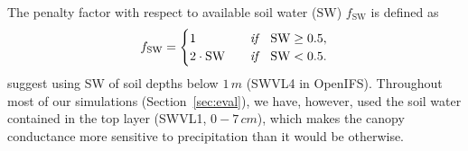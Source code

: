 \documentclass[gmd, manuscript]{copernicus}
\begin{document}
The penalty factor with respect to available soil water ($\text{SW}$) $f_\text{SW}$ is defined as 
%
\begin{equation}
  f_\text{SW} =
  \begin{cases}
    1 & \quad \emph{if} \quad \text{SW} \geq 0.5,\\
    2 \cdot \text{SW}  & \quad \emph{if} \quad \text{SW} < 0.5.
  \end{cases}
\end{equation}
\citet{ACP:Simpson2012} suggest using SW of soil depths below $1\,\unit{m}$ (SWVL4 in OpenIFS). Throughout most of our simulations (Section~\ref{sec:eval}), we have, however, used the soil water contained in the top layer (SWVL1, $0-7\,\unit{cm}$), which makes the canopy conductance more sensitive to precipitation than it would be otherwise.
\end{document}
